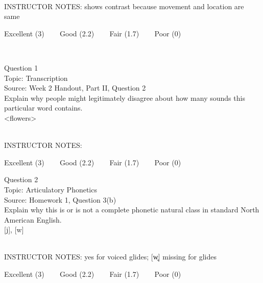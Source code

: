 \documentclass[12pt]{article}
\begin{document}
~\\
INSTRUCTOR NOTES: shows contrast because movement and location are same


\vfill
Excellent (3) ~~~ Good (2.2) ~~~ Fair (1.7) ~~~ Poor (0)
\newpage

\begin{center}
\textbf{{\color{red}{\HUGE END OF EXAM}}}\\

\end{center}
\newpage

\begin{center}
\textbf{{\color{blue}{\HUGE START OF EXAM\\}}}

\textbf{{\color{blue}{\HUGE Student ID: 40922\\}}}

\textbf{{\color{blue}{\HUGE \\}}}

\end{center}
\newpage

{\large Question 1}\\

Topic: Transcription\\
Source: Week 2 Handout, Part II, Question 2\\

Explain why people might legitimately disagree about how many sounds this particular word contains.\\

<flowers>


~\\
INSTRUCTOR NOTES: 


\vfill
Excellent (3) ~~~ Good (2.2) ~~~ Fair (1.7) ~~~ Poor (0)
\newpage

{\large Question 2}\\

Topic: Articulatory Phonetics\\
Source: Homework 1, Question 3(b)\\

Explain why this is or is not a complete phonetic natural class in standard North American English.\\

{[j]}, {[w]}


~\\
INSTRUCTOR NOTES: yes for voiced glides; [w̥] missing for glides


\vfill
Excellent (3) ~~~ Good (2.2) ~~~ Fair (1.7) ~~~ Poor (0)
\newpage
\end{document}
